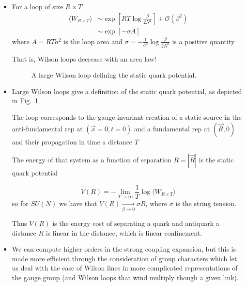 \begin{itemize}
    \item For a loop of size $R \times T$
\begin{align}
    \langle W_{R \times T} \rangle &\sim \exp\left[ R T \log \frac{\beta}{2 N^2}\right] + \mathcal{O}(\beta^2) \nonumber \\
    &\sim \exp[-\sigma A]
\end{align}
where $A = R T a^2$ is the loop area and $\sigma = - \frac{1}{a^2} \log \frac{\beta}{2 N^2}$ is a positive quantity

That is, Wilson loops decrease with an area law!
\begin{figure}
    \centering
    \caption{A large Wilson loop defining the static quark potential.}
    \label{fig:sqp}
\end{figure}
\item Large Wilson loops give a definition of the static quark potential, as depicted in Fig.~\ref{fig:sqp}

    The loop corresponds to the gauge invariant creation of a static source in the anti-fundamental rep at $(\vec x=0, t=0)$ and a fundamental rep at $(\vec R,0)$ and their propagation in time a distance $T$

    The energy of that system as a function of separation $R=|\vec{R}|$ is the static quark potential
    
\begin{equation}
    V(R) = - \lim_{T\to \infty} \frac{1}{T}\log \langle W_{R \times T} \rangle
\end{equation}
so for $SU(N)$ we have that $V(R) \underset{\beta \to 0}{\rightarrow} \sigma R$, where $\sigma$ is the string tension.

Thus $V(R)$ is the energy cost of separating a quark and antiquark a distance $R$ is linear in the distance, which is linear confinement.


\item We can compute higher orders in the strong coupling expansion, but this is made more efficient through the consideration of group characters which let us deal  with the case of Wilson lines in more complicated representations of the gauge group (and Wilson loops that wind multiply though a given link).

\end{itemize}



